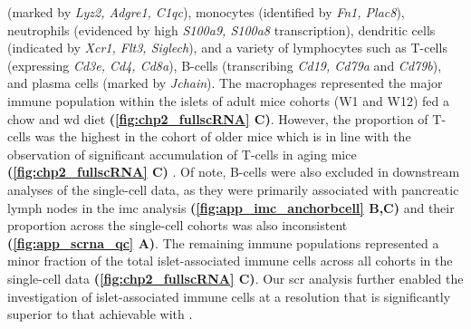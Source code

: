 (marked by \textit{Lyz2, Adgre1, C1qc}), monocytes (identified by \textit{Fn1, Plac8}), neutrophils (evidenced by high \textit{S100a9, S100a8} transcription), dendritic cells (indicated by \textit{Xcr1, Flt3, Siglech}), and a variety of lymphocytes such as T-cells (expressing \textit{Cd3e, Cd4, Cd8a}), B-cells (transcribing \textit{Cd19, Cd79a} and \textit{Cd79b}), and plasma cells (marked by \textit{Jchain}). The macrophages represented the major immune population within the islets of adult mice cohorts (W1 and W12) fed a chow and \gls{wd} diet \textbf{(\autoref{fig:chp2_fullscRNA} C)}. However, the proportion of T-cells was the highest in the cohort of older mice which is in line with the observation of significant accumulation of T-cells in aging mice \textbf{(\autoref{fig:chp2_fullscRNA} C)} \textbf{\cite{denroche_t_2021}}. Of note, B-cells were also excluded in downstream analyses of the single-cell data, as they were primarily associated with pancreatic lymph nodes in the \gls{imc} analysis \textbf{(\autoref{fig:app_imc_anchorbcell} B,C)} and their proportion across the single-cell cohorts was also inconsistent \textbf{(\autoref{fig:app_scrna_qc} A)}. The remaining immune populations represented a minor fraction of the total islet-associated immune cells across all cohorts in the single-cell data \textbf{(\autoref{fig:chp2_fullscRNA} C)}. Our \gls{scr} analysis further enabled the investigation of islet-associated immune cells at a resolution that is significantly superior to that achievable with .\\

